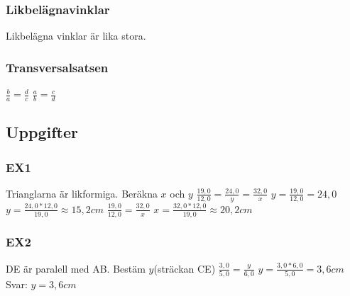 \documentclass[a4paper,10pt]{article}
\begin{document}
\begin{flushleft}
    \subsubsection{Likbelägnavinklar}
      Likbelägna vinklar är lika stora.
    \subsubsection{Transversalsatsen}
      $ \frac{b}{a} = \frac{d}{c} $
      $ \frac{a}{b} = \frac{c}{d} $\newline
  \subsection{Uppgifter}
    \subsubsection{EX1}
      Trianglarna är likformiga. Beräkna $x$ och $y$
      $ \frac{19,0}{12,0} = \frac{24,0}{y} = \frac{32,0}{x} $\newline
      $ y = \frac{19,0}{12,0} = 24,0 $\newline
      $ y = \frac{24,0*12,0}{19,0}\approx15,2cm $\newline
      $ \frac{19,0}{12,0} = \frac{32,0}{x} $\newline
      $ x = \frac{32,0*12,0}{19,0}\approx20,2cm $\newline
    \subsubsection{EX2}
      DE är paralell med AB. Bestäm $y$(sträckan CE)
      $ \frac{3,0}{5,0} = \frac{y}{6,0} $\newline
      $ y = \frac{3,0*6,0}{5,0} = 3,6cm$\newline
      Svar: $ y = 3,6cm $

\end{flushleft}
\end{document}
